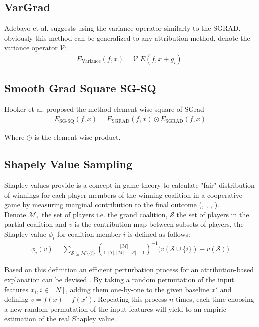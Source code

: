 \documentclass[12pt]{report}
\begin{document}
\subsection{VarGrad}
Adebayo et al. \cite{DBLP:journals/corr/abs-1810-03307} suggests using the variance operator similarly to the SGRAD. obviously this method can be generalized to any attribution method, denote the variance operator $\mathcal{V}$:
\begin{align*}
	E_\text{Variance}(f, x)  = \mathcal{V} \big[E(f, x + g_i)\big]
\end{align*}


\subsection{Smooth Grad Square SG-SQ}
Hooker et al. \cite{https://doi.org/10.48550/arxiv.1806.10758} proposed the method element-wise square of SGrad 
\begin{align*}
	E_\text{SG-SQ}(f, x)  = E_\text{SGRAD}(f, x) \odot E_\text{SGRAD}(f, x)
\end{align*}

Where $\odot$ is the element-wise product.


\subsection{Shapely Value Sampling}
Shapley values provide is a concept in game theory to calculate "fair" distribution of winnings for each player members of the winning coalition in a cooperative game by measuring marginal contribution to the final outcome (\cite{CASTRO20091726}, \cite{trumbelj2010AnEE} \cite{Shapley+2016+307+318}, \cite{https://doi.org/10.48550/arxiv.2104.12199}, \cite{https://doi.org/10.48550/arxiv.1903.10464}).\\
		
Denote $\mathcal{M}, $ the set of players i.e. the grand coalition, $\mathcal{S}$ the set of players in the partial coalition and $v$ is the contribution map between subsets of players, the Shapley value $\phi_i$ for coalition member $i$ is defined as follows:
\begin{align*}
	\phi_i(v)=  \sum_{\mathcal{S} \subseteq \mathcal{M} \setminus \{i\}} {|\mathcal{M}| \choose  1, |\mathcal{S}|, |\mathcal{M}| -|\mathcal{S}| -1}^{-1}\Big(v(\mathcal{S}\cup \{i\}) - v(\mathcal{S}) \Big)
\end{align*}
	
Based on this definition an efficient  perturbation process for an attribution-based explanation can be devised \cite{strumbelj2010efficient}. By taking a random permutation of the input features $x_i, i \in [N]$, adding them one-by-one to the given baseline $x'$ and defining $v=f(x)- f(x')$. Repeating this process $n$ times, each time choosing a new random permutation of the input features will yield to an empiric estimation of the real Shapley value.
\end{document}
